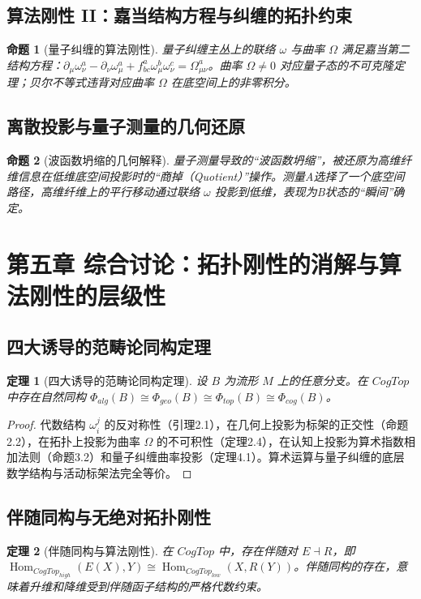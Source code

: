 \documentclass[11pt,a4paper]{article}
\newtheorem{theorem}{定理}
\newtheorem{proposition}{命题}
\begin{document}
\subsection{算法刚性 II：嘉当结构方程与纠缠的拓扑约束}
\begin{proposition}[量子纠缠的算法刚性]
量子纠缠主丛上的联络 \(\omega\) 与曲率 \(\Omega\) 满足嘉当第二结构方程：\(\partial_\mu \omega_\nu^a-\partial_\nu \omega_\mu^a+f_{bc}^a \omega_\mu^b\omega_\nu^c=\Omega_{\mu\nu}^a\)。曲率 \(\Omega\neq 0\) 对应量子态的不可克隆定理；贝尔不等式违背对应曲率 \(\Omega\) 在底空间上的非零积分。
\end{proposition}

\subsection{离散投影与量子测量的几何还原}
\begin{proposition}[波函数坍缩的几何解释]
量子测量导致的“波函数坍缩”，被还原为高维纤维信息在低维底空间投影时的“商掉（Quotient）”操作。测量A选择了一个底空间路径，高维纤维上的平行移动通过联络 \(\omega\) 投影到低维，表现为B状态的“瞬间”确定。
\end{proposition}

\clearpage
\section{第五章 综合讨论：拓扑刚性的消解与算法刚性的层级性}
\subsection{四大诱导的范畴论同构定理}
\begin{theorem}[四大诱导的范畴论同构定理]
设 \(B\) 为流形 \(M\) 上的任意分支。在 \(CogTop\) 中存在自然同构 \(\Phi_{alg}(B)\cong \Phi_{geo}(B)\cong \Phi_{top}(B)\cong \Phi_{cog}(B)\)。
\end{theorem}
\begin{proof}
代数结构 \(\omega_i^j\) 的反对称性（引理2.1），在几何上投影为标架的正交性（命题2.2），在拓扑上投影为曲率 \(\Omega\) 的不可积性（定理2.4），在认知上投影为算术指数相加法则（命题3.2）和量子纠缠曲率投影（定理4.1）。算术运算与量子纠缠的底层数学结构与活动标架法完全等价。
\end{proof}

\subsection{伴随同构与无绝对拓扑刚性}
\begin{theorem}[伴随同构与算法刚性]
在 \(CogTop\) 中，存在伴随对 \(E\dashv R\)，即 \(\operatorname{Hom}_{CogTop_{high}}(E(X),Y)\cong \operatorname{Hom}_{CogTop_{low}}(X,R(Y))\)。伴随同构的存在，意味着升维和降维受到伴随函子结构的严格代数约束。
\end{theorem}
\end{document}
